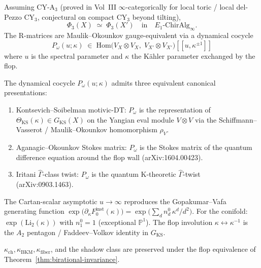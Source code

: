 \documentclass[11pt]{article}
\begin{document}
\begin{theorem}
\label{thm:birational-invariance}
Assuming CY-A$_3$ (proved in Vol~III $\infty$-categorically for local
toric / local del-Pezzo CY$_3$, conjectural on compact CY$_3$ beyond
tilting),
\[
  \Phi_3(X) \;\simeq\; \Phi_3(X')
  \quad
  \text{in}
  \quad
  E_1\text{-}\mathrm{ChirAlg}_{\infty}.
\]
The R-matrices are Maulik--Okounkov gauge-equivalent via a
dynamical cocycle
\[
  P_{\omega}(u; \kappa)
  \;\in\;
  \mathrm{Hom}\bigl(V_X \otimes V_X,\; V_{X'} \otimes V_{X'}\bigr)[\![u, \kappa^{\pm 1}]\!]
\]
where $u$ is the spectral parameter and $\kappa$ the Kähler parameter
exchanged by the flop.
\end{theorem}

\begin{theorem}
\label{thm:mo-motivic-dt-triple}
The dynamical cocycle $P_{\omega}(u; \kappa)$ admits three equivalent
canonical presentations:
\begin{enumerate}
\item[(KS)] Kontsevich--Soibelman motivic-DT: $P_{\omega}$ is the
representation of $\Theta_{\mathrm{KS}}(\kappa) \in G_{\mathrm{KS}}(X)$
on the Yangian eval module $V \otimes V$ via the
Schiffmann--Vasserot / Maulik--Okounkov homomorphism $\rho_V$.
\item[(AO)] Aganagic--Okounkov Stokes matrix: $P_{\omega}$ is the Stokes
matrix of the quantum difference equation around the flop wall
(arXiv:1604.00423).
\item[(I)] Iritani $\widehat{\Gamma}$-class twist: $P_{\omega}$ is
the quantum K-theoretic $\widehat{\Gamma}$-twist
(arXiv:0903.1463).
\end{enumerate}
The Cartan-scalar asymptotic $u \to \infty$ reproduces the
Gopakumar--Vafa generating function
$\exp\!\bigl(\partial_{\kappa} F_0^{\mathrm{inst}}(\kappa)\bigr)
= \exp\!\bigl(\sum_d n_d^0\,\kappa^d / d^2\bigr)$. For the conifold:
$\exp(\mathrm{Li}_2(\kappa))$ with $n_1^0 = 1$ (exceptional $\mathbb{P}^1$).
The flop involution $\kappa \leftrightarrow \kappa^{-1}$ is the
$A_2$ pentagon / Faddeev--Volkov identity in $G_{\mathrm{KS}}$.
\end{theorem}

\begin{corollary}
$\kappa_{\mathrm{ch}}, \kappa_{\mathrm{BKM}}, \kappa_{\mathrm{fiber}}$,
and the shadow class are preserved under the flop equivalence of
Theorem~\ref{thm:birational-invariance}.
\end{corollary}
\end{document}
